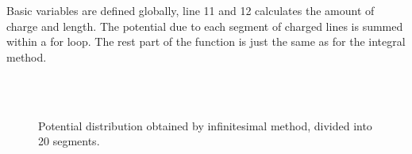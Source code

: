 \documentclass[journal]{IEEEtran}
\begin{document}
Basic variables are defined globally, line 11 and 12 calculates the amount of charge and length. The potential due to each segment of charged lines is summed within a for loop. The rest part of the function is just the same as for the integral method.

\begin{figure}[!hbtp]
    \centering
     \\
     \\
    \caption{Potential distribution obtained by infinitesimal method, divided into 20 segments.}
    \label{fig:infinitesimal_20}
\end{figure}
\end{document}
